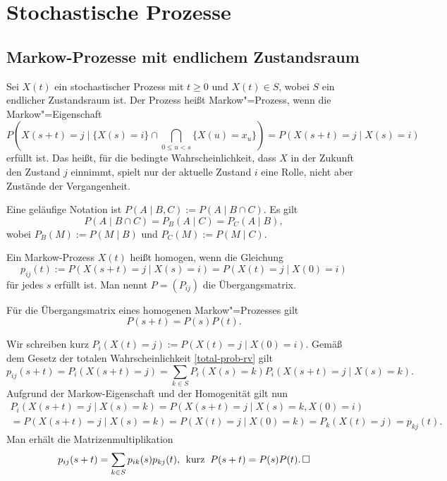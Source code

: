 \newpage
\section{Stochastische Prozesse}%

\subsection{Markow-Prozesse mit endlichem Zustandsraum}

\begin{Definition}
Sei $X(t)$ ein stochastischer Prozess mit $t\ge 0$ und $X(t)\in S$,
wobei $S$ ein endlicher Zustandsraum ist. Der Prozess heißt
Markow"=Prozess, wenn die Markow"=Eigenschaft
\[P(X(s+t)=j\mid \{X(s)=i\}\cap\bigcap_{0\le u<s}\{X(u)=x_u\}) = P(X(s+t)=j\mid X(s)=i)\]
erfüllt ist. Das heißt, für die bedingte Wahrscheinlichkeit, dass
$X$ in der Zukunft den Zustand $j$ einnimmt, spielt nur der aktuelle
Zustand $i$ eine Rolle, nicht aber Zustände der Vergangenheit.
\end{Definition}

\noindent
{} Eine geläufige Notation
ist $P(A\mid B,C):=P(A\mid B\cap C).$ Es gilt
\[P(A\mid B\cap C) = P_B(A\mid C) = P_C(A\mid B),\]
wobei $P_B(M):=P(M\mid B)$ und $P_C(M):=P(M\mid C)$.

\begin{Definition}%
Ein Markow-Prozess $X(t)$ heißt homogen, wenn die Gleichung
\[p_{ij}(t) := P(X(s+t)=j\mid X(s)=i) = P(X(t)=j\mid X(0)=i)\]
für jedes $s$ erfüllt ist. Man nennt $P=(P_{ij})$ die Übergangsmatrix.
\end{Definition}

\begin{Satz}%
\newlinefirst
Für die Übergangsmatrix eines homogenen Markow"=Prozesses gilt
\[P(s+t) = P(s)P(t).\]
\end{Satz}

\begin{Beweis}
Wir schreiben kurz $P_i(X(t)=j):=P(X(t)=j\mid X(0)=i)$. Gemäß dem
Gesetz der totalen Wahrscheinlichkeit \ref{total-prob-rv} gilt
\[p_{ij}(s+t) = P_i(X(s+t)=j)
= \sum_{k\in S} P_i(X(s)=k) P_i(X(s+t)=j\mid X(s)=k).\]
Aufgrund der Markow-Eigenschaft und der Homogenität gilt nun
\begin{gather*}
P_i(X(s+t)=j\mid X(s)=k) = P(X(s+t)=j\mid X(s)=k, X(0)=i)\\
= P(X(s+t)=j\mid X(s)=k) = P(X(t)=j\mid X(0)=k) = P_k(X(t)=j) = p_{kj}(t).
\end{gather*}
Man erhält die Matrizenmultiplikation
\[p_{ij}(s+t) = \sum_{k\in S} p_{ik}(s) p_{kj}(t),\;\,
\text{kurz}\;\; P(s+t)=P(s)P(t).\,\square\]
\end{Beweis}

